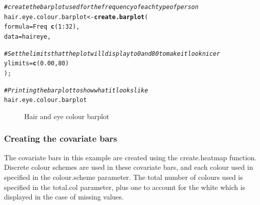 \documentclass[letterpaper]{article}\usepackage[]{graphicx}\usepackage[]{color}
\makeatletter
\newcommand{\hlnum}[1]{\textcolor[rgb]{0.686,0.059,0.569}{#1}}%
\newcommand{\hlcom}[1]{\textcolor[rgb]{0.678,0.584,0.686}{\textit{#1}}}%
\newcommand{\hlopt}[1]{\textcolor[rgb]{0,0,0}{#1}}%
\newcommand{\hlstd}[1]{\textcolor[rgb]{0.345,0.345,0.345}{#1}}%
\newcommand{\hlkwb}[1]{\textcolor[rgb]{0.69,0.353,0.396}{#1}}%
\newcommand{\hlkwc}[1]{\textcolor[rgb]{0.333,0.667,0.333}{#1}}%
\newcommand{\hlkwd}[1]{\textcolor[rgb]{0.737,0.353,0.396}{\textbf{#1}}}%
\newenvironment{kframe}{%
 \def\at@end@of@kframe{}%
 \ifinner\ifhmode%
  \def\at@end@of@kframe{\end{minipage}}%
  \begin{minipage}{\columnwidth}%
 \fi\fi%
 \def\FrameCommand##1{\hskip\@totalleftmargin \hskip-\fboxsep
 \colorbox{shadecolor}{##1}\hskip-\fboxsep
     \hskip-\linewidth \hskip-\@totalleftmargin \hskip\columnwidth}%
 \MakeFramed {\advance\hsize-\width
   \@totalleftmargin\z@ \linewidth\hsize
   \@setminipage}}%
 {\par\unskip\endMakeFramed%
 \at@end@of@kframe}
\newenvironment{knitrout}{}{} %
\makeatother
\begin{document}
\begin{knitrout}
\color{fgcolor}\begin{kframe}
\begin{alltt}
\hlcom{# create the barplot used for the frequency of each type of person}
\hlstd{hair.eye.colour.barplot} \hlkwb{<-} \hlkwd{create.barplot}\hlstd{(}
        \hlkwc{formula} \hlstd{= Freq} \hlopt{~} \hlkwd{c}\hlstd{(}\hlnum{1}\hlopt{:}\hlnum{32}\hlstd{),}
        \hlkwc{data} \hlstd{= haireye,}

        \hlcom{# Set the limits that the plot will display to 0 and 80 to make it look nicer}
        \hlkwc{ylimits} \hlstd{=} \hlkwd{c}\hlstd{(}\hlnum{0.00}\hlstd{,} \hlnum{80}\hlstd{)}
        \hlstd{);}

\hlcom{# Printing the barplot to show what it looks like}
\hlstd{hair.eye.colour.barplot}
\end{alltt}
\end{kframe}\begin{figure}[]


{\centering {} 

}

\caption[Hair and eye colour barplot]{Hair and eye colour barplot\label{fig:multiplotex1_barplot}}
\end{figure}


\end{knitrout}

\subsubsection{Creating the covariate bars}
The covariate bars in this example are created using the create.heatmap function.  Discrete colour schemes are used in these covariate bars, and each colour used in specified in the colour.scheme parameter. The total number of colours used is specified in the total.col parameter, plus one to account for the white which is displayed in the case of missing values.
\end{document}
